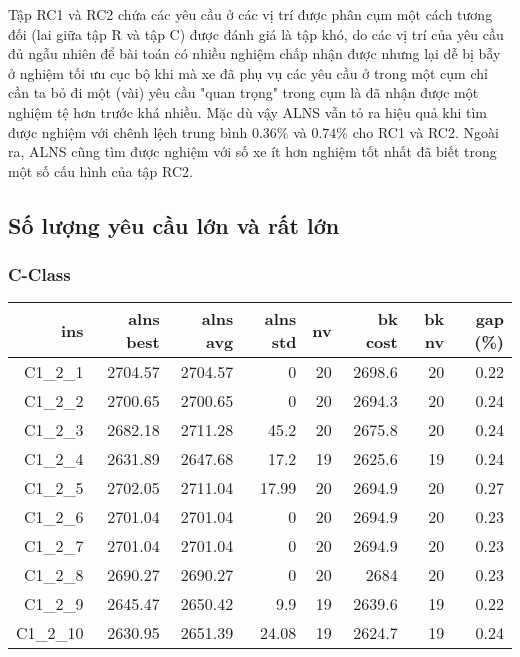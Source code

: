   Tập RC1 và RC2 chứa các yêu cầu ở các vị trí được phân cụm một cách tương đối (lai giữa tập R và tập C) được đánh giá là tập khó, do các vị trí của yêu cầu đủ ngẫu nhiên để bài toán có nhiều nghiệm chấp nhận được nhưng lại dễ bị bẫy ở nghiệm tối ưu cục bộ khi mà xe đã phụ vụ các yêu cầu ở trong một cụm chỉ cần ta bỏ đi một (vài) yêu cầu "quan trọng" trong cụm là đã nhận được một nghiệm tệ hơn trước khá nhiều. Mặc dù vậy ALNS vẫn tỏ ra hiệu quả khi tìm được nghiệm với chênh lệch trung bình $0.36\%$ và $0.74\%$ cho RC1 và RC2. Ngoài ra, ALNS cũng tìm được nghiệm với số xe ít hơn nghiệm tốt nhất đã biết trong một số cấu hình của tập RC2.

  \subsection{Số lượng yêu cầu lớn và rất lớn}

  \subsubsection*{C-Class}

  \begin{table}[caption={Kết quả đo với tập HG\_C\_1\_2 200 yêu cầu}, label=exp:HGC12]
    \centering
    \begin{tabular}{rrrrrrrr}
    \hline
    ins & alns best & alns avg & alns std & nv & bk cost & bk nv & gap (\%) \\ \hline
    C1\_2\_1 & 2704.57 & 2704.57 & 0 & 20 & 2698.6 & 20 & 0.22 \\ \hline
    C1\_2\_2 & 2700.65 & 2700.65 & 0 & 20 & 2694.3 & 20 & 0.24 \\ \hline
    C1\_2\_3 & 2682.18 & 2711.28 & 45.2 & 20 & 2675.8 & 20 & 0.24 \\ \hline
    C1\_2\_4 & 2631.89 & 2647.68 & 17.2 & 19 & 2625.6 & 19 & 0.24 \\ \hline
    C1\_2\_5 & 2702.05 & 2711.04 & 17.99 & 20 & 2694.9 & 20 & 0.27 \\ \hline
    C1\_2\_6 & 2701.04 & 2701.04 & 0 & 20 & 2694.9 & 20 & 0.23 \\ \hline
    C1\_2\_7 & 2701.04 & 2701.04 & 0 & 20 & 2694.9 & 20 & 0.23 \\ \hline
    C1\_2\_8 & 2690.27 & 2690.27 & 0 & 20 & 2684 & 20 & 0.23 \\ \hline
    C1\_2\_9 & 2645.47 & 2650.42 & 9.9 & 19 & 2639.6 & 19 & 0.22 \\ \hline
    C1\_2\_10 & 2630.95 & 2651.39 & 24.08 & 19 & 2624.7 & 19 & 0.24 \\ \hline
    \end{tabular}
  \end{table}

